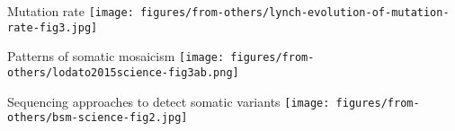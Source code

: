 \documentclass{beamer}
\begin{document}
\begin{frame}{Mutation rate}
\texttt{[image: figures/from-others/lynch-evolution-of-mutation-rate-fig3.jpg]}
\end{frame}

\begin{frame}{Patterns of somatic mosaicism}
\texttt{[image: figures/from-others/lodato2015science-fig3ab.png]}
\end{frame}

\begin{frame}{Sequencing approaches to detect somatic variants}
\texttt{[image: figures/from-others/bsm-science-fig2.jpg]}
\end{frame}
\end{document}

